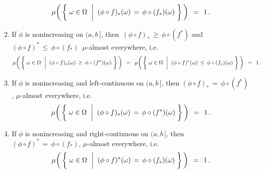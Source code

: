 \begin{lemma}
\begin{enumerate}
\begin{equation*}
	\mu\!\left(\,\left\{\;
		\omega \in \Omega
		\,\;\left\vert\;\;
		(\phi \circ f)_{*}(\omega) \,\overset{{\color{white}\vert}}{=}\, \phi \circ (f_{*})(\omega)
		\right.
	\,\right\}\,\right)
	\,\;=\;\, 1\,.
	\end{equation*}
\item
	If $\phi$ is nonincreasing on $(a,b\,]$, then
	\,$(\phi \circ f)_{*} \,\geq\, \phi \circ (f^{*})$
	\;and\;
	$(\phi \circ f)^{*} \,\leq\, \phi \circ (f_{*})$\,
	$\mu$-almost everywhere, i.e.
	\begin{equation*}
	\mu\!\left(\,\left\{\;
		\omega \in \Omega
		\,\;\left\vert\;\;
		(\phi \circ f)_{*}(\omega) \,\overset{{\color{white}\vert}}{\geq}\, \phi \circ (f^{*})(\omega)
		\right.
	\,\right\}\,\right)
	\,\;=\;\,
	\mu\!\left(\,\left\{\;
		\omega \in \Omega
		\,\;\left\vert\;\;
		(\phi \circ f)^{*}(\omega) \,\overset{{\color{white}\vert}}{\leq}\, \phi \circ (f_{*})(\omega)
		\right.
	\,\right\}\,\right)
	\,\;=\;\, 1\,.
	\end{equation*}
\item
	If $\phi$ is nonincreasing and left-continuous on $(a,b\,]$, then
	$(\phi \circ f)_{*} \,=\, \phi \circ (f^{*})$, $\mu$-almost everywhere, i.e.
	\begin{equation*}
	\mu\!\left(\,\left\{\;
		\omega \in \Omega
		\,\;\left\vert\;\;
		(\phi \circ f)_{*}(\omega) \,\overset{{\color{white}\vert}}{=}\, \phi \circ (f^{*})(\omega)
		\right.
	\,\right\}\,\right)
	\,\;=\;\, 1\,.
	\end{equation*}
\item
	If $\phi$ is nonincreasing and right-continuous on $(a,b\,]$, then
	$(\phi \circ f)^{*} \,=\, \phi \circ (f_{*})$, $\mu$-almost everywhere, i.e.
	\begin{equation*}
	\mu\!\left(\,\left\{\;
		\omega \in \Omega
		\,\;\left\vert\;\;
		(\phi \circ f)^{*}(\omega) \,\overset{{\color{white}\vert}}{=}\, \phi \circ (f_{*})(\omega)
		\right.
	\,\right\}\,\right)
	\,\;=\;\, 1\,.
	\end{equation*}
\end{enumerate}
\end{lemma}
\proof
